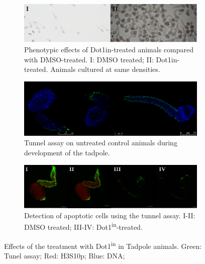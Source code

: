 \documentclass[11pt,twoside,a4paper]{report}
\begin{document}
	\begin{figure}[h!]
		\setlength{\belowcaptionskip}{5pt}
		\centering
		\begin{subfigure}{1\textwidth}
			\centering
			\includegraphics[width=1\linewidth]{pngs/tb_phenotype.png}
			\caption{Phenotypic effects of Dot1in-treated animals compared with DMSO-treated.
				{\footnotesize
					I: DMSO treated;
					II: Dot1in-treated.
					Animals cultured at same densities.
				}
			}
		\end{subfigure}
		\begin{subfigure}{1\textwidth}
			\centering
			\includegraphics[width=1\linewidth]{pngs/tb_tunnel.png}
			\caption{Tunnel assay on untreated control animals during development of the tadpole.}
		\end{subfigure}
		\begin{subfigure}{1\textwidth}
			\centering
			\includegraphics[width=1\linewidth]{pngs/tb_dot1in.png}
			\caption{
				Detection of apoptotic cells using the tunnel assay.
				{\footnotesize
					I-II: DMSO treated;
					III-IV: Dot1\textsuperscript{in}-treated.
				}
			}
		\end{subfigure}
		\caption[Effects of the treatment with Dot1\textsuperscript{in} in Tadpole animals]
		{Effects of the treatment with Dot1\textsuperscript{in} in Tadpole animals. Green: Tunel assay; Red: H3S10p; Blue: DNA;}
		\label{fig:Dot1in_TB}
	\end{figure}
	
\end{document}

